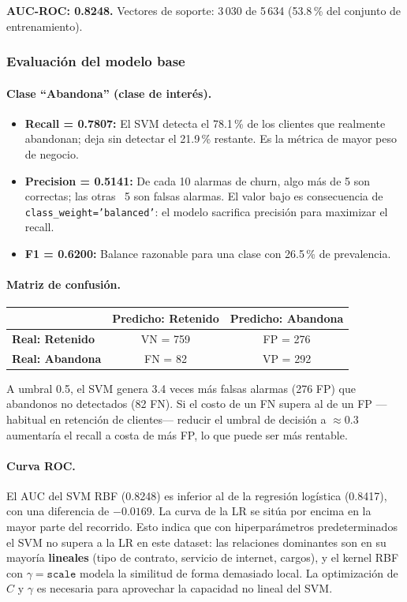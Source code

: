 \documentclass[spanish]{article}
\begin{document}
\textbf{AUC-ROC: 0.8248.} Vectores de soporte: 3\,030 de 5\,634 (53.8\,\% del conjunto de entrenamiento).

\subsubsection{Evaluación del modelo base}

\paragraph{Clase ``Abandona'' (clase de interés).}

\begin{itemize}
    \item \textbf{Recall = 0.7807:} El SVM detecta el 78.1\,\% de los clientes que realmente abandonan; deja sin detectar el 21.9\,\% restante. Es la métrica de mayor peso de negocio.
    \item \textbf{Precision = 0.5141:} De cada 10 alarmas de churn, algo más de 5 son correctas; las otras ~5 son falsas alarmas. El valor bajo es consecuencia de \texttt{class\_weight='balanced'}: el modelo sacrifica precisión para maximizar el recall.
    \item \textbf{F1 = 0.6200:} Balance razonable para una clase con 26.5\,\% de prevalencia.
\end{itemize}

\paragraph{Matriz de confusión.}

\begin{center}
\begin{tabular}{lcc}
\toprule
 & \textbf{Predicho: Retenido} & \textbf{Predicho: Abandona} \\
\midrule
\textbf{Real: Retenido} & VN = 759 & FP = 276 \\
\textbf{Real: Abandona} & FN = 82  & VP = 292 \\
\bottomrule
\end{tabular}
\end{center}

A umbral 0.5, el SVM genera 3.4 veces más falsas alarmas (276 FP) que abandonos no detectados (82 FN). Si el costo de un FN supera al de un FP —habitual en retención de clientes— reducir el umbral de decisión a $\approx 0.3$ aumentaría el recall a costa de más FP, lo que puede ser más rentable.

\paragraph{Curva ROC.} El AUC del SVM RBF (0.8248) es inferior al de la regresión logística (0.8417), con una diferencia de $-0.0169$. La curva de la LR se sitúa por encima en la mayor parte del recorrido. Esto indica que con hiperparámetros predeterminados el SVM no supera a la LR en este dataset: las relaciones dominantes son en su mayoría \textbf{lineales} (tipo de contrato, servicio de internet, cargos), y el kernel RBF con $\gamma=\texttt{scale}$ modela la similitud de forma demasiado local. La optimización de $C$ y $\gamma$ es necesaria para aprovechar la capacidad no lineal del SVM.
\end{document}
